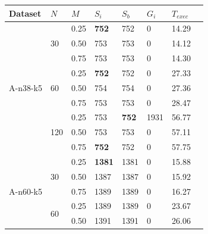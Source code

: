 \begin{table}[h!]
    \centering
    \begin{threeparttable}
    \footnotesize
        \begin{tabularx}{0.45\textwidth}{ l X X X X X X X}
            \toprule
            \textbf{Dataset} & $N$ & $M$ & $S_i$ & $S_b$ & $G_i$ & $T_{exec}$\\ [0.5ex]
            \midrule
            \multirow{9}{*}{A-n38-k5}   & \multirow{3}{*}{30}   & 0.25  & \textbf{752} & 752 & 0 & 14.29\\ [0.5ex]
                                        &                       & 0.50  & 753 & 753 & 0 & 14.12\\ [0.5ex]
                                        &                       & 0.75  & 753 & 753 & 0 & 14.30\\ [0.5ex]
            \cmidrule{2-7}
                                        & \multirow{3}{*}{60}   & 0.25  & \textbf{752} & 752 & 0 & 27.33\\ [0.5ex]
                                        &                       & 0.50  & 754 & 754 & 0 & 27.36\\ [0.5ex]
                                        &                       & 0.75  & 753 & 753 & 0 & 28.47\\ [0.5ex]
            \cmidrule{2-7}
                                        & \multirow{3}{*}{120}  & 0.25  & 753 & \textbf{752} & 1931 & 56.77\\ [0.5ex]
                                        &                       & 0.50  & 753 & 753 & 0 & 57.11\\ [0.5ex]
                                        &                       & 0.75  & \textbf{752} & 752 & 0 & 57.75\\ [0.5ex]
            \midrule
            \multirow{9}{*}{A-n60-k5}   & \multirow{3}{*}{30}   & 0.25  & \textbf{1381} & 1381 & 0 & 15.88\\ [0.5ex]
                                        &                       & 0.50  & 1387 & 1387 & 0 & 15.92\\ [0.5ex]
                                        &                       & 0.75  & 1389 & 1389 & 0 & 16.27\\ [0.5ex]
            \cmidrule{2-7}
                                        & \multirow{3}{*}{60}   & 0.25  & 1389 & 1389 & 0 & 23.67\\ [0.5ex]
                                        &                       & 0.50  & 1391 & 1391 & 0 & 26.06\\ [0.5ex]

\end{tabularx}
\end{threeparttable}
\end{table}
